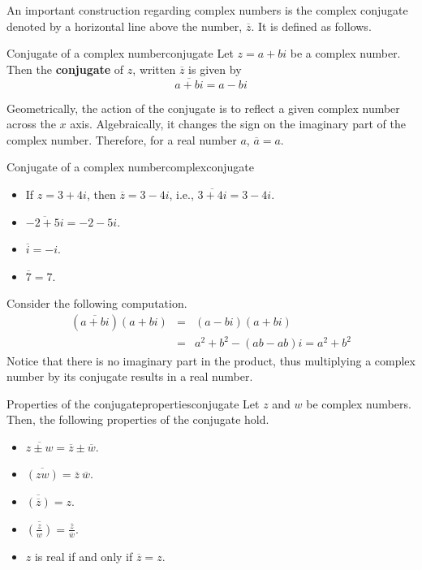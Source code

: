 An important construction regarding complex numbers is the complex
conjugate denoted by a horizontal line above the number, $\overline{z}$. It
is defined as follows.

\begin{definition}{Conjugate of a complex number}{conjugate}
Let $z = a+bi$ be a complex number. Then the \textbf{conjugate} of $z$, written $\overline{z}$ is given by 
\begin{equation*}
\overline{a+bi}= a-bi
\end{equation*}
\end{definition}

Geometrically, the action of the conjugate is to reflect a given complex number across the $x$ axis.
Algebraically, it changes the sign on the imaginary part of the complex number. Therefore, for a real number $a$, $\overline{a} = a$. 

\begin{example}{Conjugate of a complex number}{complexconjugate}
\begin{itemize}

\item If $z=3+4i$, then $\overline{z}=3-4i$,
i.e., $\overline{3+4i}=3-4i$.

\item $\overline{-2+5i}= -2-5i$.

\item $\overline{i}= -i$.

\item $\overline{7}= 7$.
\end{itemize}
\end{example}

Consider the following computation. 
\begin{eqnarray*}
\left( \overline{a+bi}\right) \left( a+bi\right) &=&\left( a-bi\right)
\left( a+bi\right) \\
&=&a^{2}+b^{2}-\left( ab-ab\right)i =a^{2}+b^{2}
\end{eqnarray*}
Notice that there is no imaginary part in the product, thus
multiplying a complex number by its conjugate results in  a real number.

\begin{theorem}{Properties of the conjugate}{propertiesconjugate}
Let $z$ and $w$ be complex numbers. Then, the following properties of the conjugate hold.

\begin{itemize}
\item
$\overline{z\pm w} = \overline{z} \pm \overline{w}$.
\item
$\overline{(zw)} = \overline{z}~ \overline{w}$.
\item
$\overline{(\overline{z})}=z$.
\item
$\overline{\left(\frac{z}{w}\right)} =
\frac{\overline{z}}{\overline{w}}$.
\item
$z$ is real if and only if $\overline{z}=z$.
\end{itemize}
\end{theorem}

